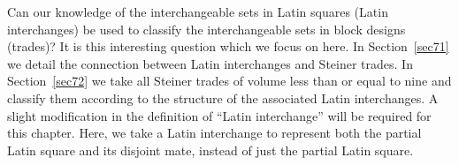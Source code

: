 \documentclass[12pt]{report}
\begin{document}
Can our knowledge of the interchangeable sets in Latin squares (Latin interchanges) be used to classify the interchangeable sets in block designs (trades)?  It is this interesting question which we focus on here.   
In  Section~\ref{sec71} we detail the connection between Latin interchanges and Steiner trades.
In Section~\ref{sec72} we take all Steiner trades of volume less than or equal to nine and classify them according to the structure of the associated Latin interchanges.
A slight modification in the definition of ``Latin interchange'' will be
required for this chapter.  Here, we take a Latin interchange to represent
both the partial Latin square and its disjoint mate, instead of just
the partial Latin square.
 
\end{document}
